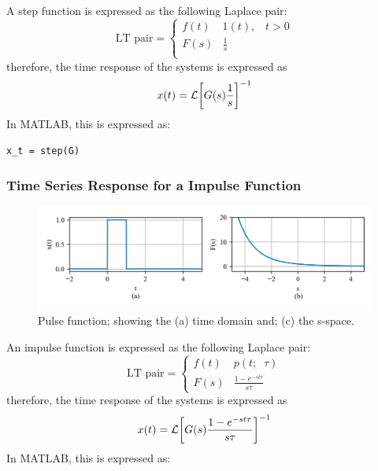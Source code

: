 \documentclass[12pt,letter]{article}
\begin{document}
A step function is expressed as the following Laplace pair:
		\begin{equation}
		\text{LT pair} =
			\begin{cases}
			f(t) & 1(t) , \; \; \; t>0 \\
			F(s) & \frac{1}{s} \\
			\end{cases}
		\end{equation}
therefore, the time response of the systems is expressed as
\begin{equation}
x(t) = \mathcal{L}{\left[G(s) \frac{1}{s}\right]}^{-1}
\end{equation}
In MATLAB, this is expressed as:

\lstset{linewidth=5.8in}
\begin{minipage}{1\textwidth}
  \begin{center}
\begin{lstlisting}
x_t = step(G)
\end{lstlisting}
  \end{center}
\end{minipage}

\subsubsection{Time Series Response for a Impulse Function}



		\begin{figure}[H]
			\centering
			\includegraphics[width=6.5in]{../figures/T_and_S_pulse_function}
			\caption{Pulse function; showing the (a) time domain and; (c) the s-space.}
			\label{fig:Laplace_pulse_transform}
		\end{figure}


An impulse function is expressed as the following Laplace pair:
		\begin{equation}
		\text{LT pair} =
			\begin{cases}
			f(t) & p(t; \; \; \tau) \\
			F(s) & \frac{1-e^{-st\tau}}{s \tau}
			\end{cases}
		\end{equation}
therefore, the time response of the systems is expressed as
\begin{equation}
x(t) = \mathcal{L}{\left[G(s) \frac{1-e^{-st\tau}}{s \tau}\right]}^{-1}
\end{equation}
In MATLAB, this is expressed as:
\end{document}
